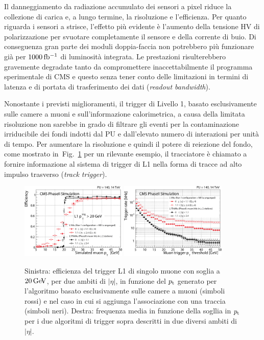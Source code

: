 Il danneggiamento da radiazione accumulato dei sensori a pixel riduce la collezione di carica e, a lungo termine, la risoluzione e l'efficienza. 
Per quanto riguarda i sensori a strisce, l'effetto pi\`u evidente \`e l'aumento della tensione HV di polarizzazione per svuotare completamente il sensore e della corrente di buio. Di conseguenza gran parte dei moduli doppia-faccia non potrebbero pi\`u funzionare gi\`a per $1000{\rm \, fb^{-1}}$ di luminosit\`a integrata. Le prestazioni risulterebbero gravemente degradate tanto da compromettere inaccettabilmente il programma sperimentale di CMS e questo senza tener conto delle limitazioni in termini di latenza e di portata di trasferimento dei dati ({\em readout bandwidth}).

Nonostante i previsti miglioramenti, il trigger di Livello 1, basato esclusivamente sulle camere a muoni e sull'informazione calorimetrica, a causa della limitata risoluzione non sarebbe in grado di filtrare gli eventi per la contaminazione irriducibile dei fondi indotti dal PU e dall'elevato numero di interazioni per unit\`a di tempo. Per aumentare la risoluzione e quindi il potere di reiezione del fondo, come mostrato in~Fig.~\ref{fig:CMSTkL1} per un rilevante esempio, il tracciatore \`e chiamato a fornire informazione al sistema di trigger di L1 nella forma di tracce ad alto impulso trasverso ({\em track trigger}).
\begin{figure}
\centering
\includegraphics[width=0.45\textwidth]{Immagini/CMSTkL1_res.PNG}
\hfill
\includegraphics[width=0.45\textwidth]{Immagini/CMSTkL1_rate.PNG}
\caption{Sinistra: efficienza del trigger L1 di singolo muone con soglia a $20{\rm \, Ge\kern-0.125em V}$, per due ambiti di $|\eta|$, in funzione del ${p_{\rm t}}$ generato per l'algoritmo basato esclusivamente sulle camere a muoni (simboli rossi) e nel caso in cui si aggiunga l'associazione con una traccia (simboli neri). Destra: frequenza media in funzione della sogllia in ${p_{\rm t}}$ per i due algoritmi di trigger sopra descritti in due diversi ambiti di $|\eta|$.}
\label{fig:CMSTkL1}
\end{figure}

